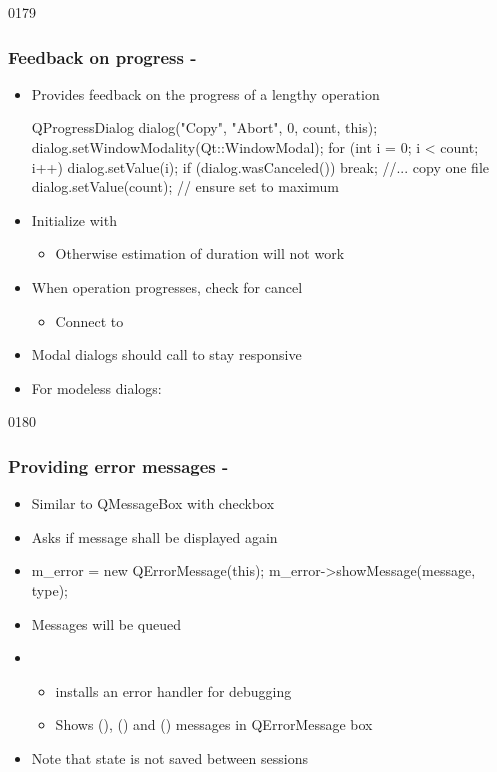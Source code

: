 \begin{slide}[fragile]{0179}
\frametitle{Feedback on progress - }
\begin{itemize}
  \item Provides feedback on the progress of a lengthy operation
   \begin{cpp}
QProgressDialog dialog("Copy", "Abort", 0, count, this);
dialog.setWindowModality(Qt::WindowModal);
for (int i = 0; i < count; i++) {
  dialog.setValue(i);
  if (dialog.wasCanceled()) { break; }
  //... copy one file
}
dialog.setValue(count); // ensure set to maximum      
    \end{cpp}
  \item Initialize with 
    \begin{itemize}
    \item Otherwise estimation of duration will not work
    \end{itemize}
  \item When operation progresses, check for cancel
    \begin{itemize}
    \item Connect to 
    \end{itemize}
  \item Modal dialogs should call  to stay responsive
  \item For modeless dialogs: 
  \end{itemize}
\end{slide}

\begin{slide}[fragile]{0180}\frametitle{Providing error messages - }\label{qerrormessage}
  \begin{itemize}
  \item Similar to QMessageBox with checkbox
  \item Asks if message shall be displayed again
 \item[]
    \begin{cpp}
m_error = new QErrorMessage(this);
m_error->showMessage(message, type);
    \end{cpp}
\item Messages will be queued
  \item {}
    \begin{itemize}
   \item installs an error handler for debugging
    \item Shows (), () and
    () messages in QErrorMessage box
    \end{itemize}
\item Note that state is not saved between sessions
\end{itemize}
\end{slide}

